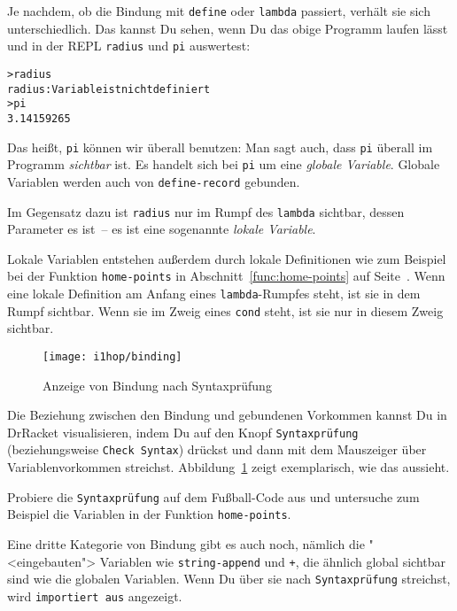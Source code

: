 Je nachdem, ob die Bindung mit \lstinline{define} oder
\lstinline{lambda} passiert, verhält sie sich unterschiedlich.  Das
kannst Du sehen, wenn Du das obige Programm laufen lässt und in der
REPL \lstinline{radius} und \lstinline{pi} auswertest:
%
\begin{alltt}
> radius
{\color{red}radius: Variable ist nicht definiert}
> pi
{\color{blue}3.14159265}
\end{alltt}
%
Das heißt, \lstinline{pi} können wir überall benutzen: Man sagt auch,
dass \lstinline{pi} überall im Programm
\textit{sichtbar} ist.  Es handelt sich bei
\lstinline{pi} um eine \textit{globale Variable}.  Globale Variablen werden auch von
\lstinline{define-record} gebunden.

Im Gegensatz dazu ist \lstinline{radius} nur im Rumpf des
\lstinline{lambda} sichtbar, dessen Parameter es ist~-- es ist eine
sogenannte \textit{lokale Variable}.

Lokale Variablen entstehen außerdem durch lokale Definitionen wie zum
Beispiel bei der Funktion \lstinline{home-points} in
Abschnitt~\ref{func:home-points} auf Seite~\pageref{func:home-points}.
Wenn eine lokale Definition am Anfang eines \lstinline{lambda}-Rumpfes
steht, ist sie in dem Rumpf sichtbar.  Wenn sie im Zweig eines
\lstinline{cond} steht, ist sie nur in diesem Zweig sichtbar.

\begin{figure}[tb]
  \centering
  \texttt{[image: i1hop/binding]}
  \caption{Anzeige von Bindung nach Syntaxprüfung}
  \label{fig:binding}
\end{figure}

Die Beziehung zwischen den Bindung und gebundenen Vorkommen kannst
Du in DrRacket visualisieren, indem Du auf den Knopf
\texttt{Syntaxprüfung} (beziehungsweise \texttt{Check Syntax})
drückst und dann mit dem Mauszeiger über Variablenvorkommen
streichst.  Abbildung~\ref{fig:binding} zeigt exemplarisch, wie das aussieht.

\begin{aufgabeinline}
  Probiere die \texttt{Syntaxprüfung} auf dem Fußball-Code aus und
  untersuche zum Beispiel die Variablen in der Funktion
  \lstinline{home-points}.
\end{aufgabeinline}

Eine dritte Kategorie von Bindung gibt es auch noch, nämlich die
"<eingebauten"> Variablen wie \texttt{string-append} und
\lstinline{+}, die ähnlich global sichtbar sind wie die globalen
Variablen.  Wenn Du über sie nach \texttt{Syntaxprüfung} streichst,
wird \texttt{importiert aus} angezeigt.


